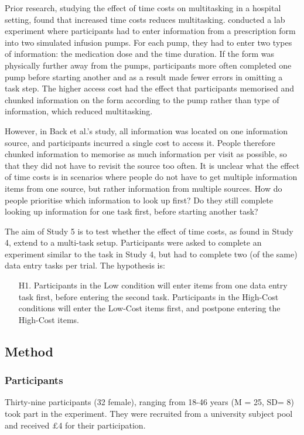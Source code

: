 Prior research, studying the effect of time costs on multitasking in a hospital setting, found that increased time costs reduces multitasking. \citet{Back2012} conducted a lab experiment where participants had to enter information from a prescription form into two simulated infusion pumps. For each pump, they had to enter two types of information: the medication dose and the time duration. If the form was physically further away from the pumps, participants more often completed one pump before starting another and as a result made fewer errors in omitting a task step. The higher access cost had the effect that participants memorised and chunked information on the form according to the pump rather than type of information, which reduced multitasking.

However, in Back et al.'s study, all information was located on one information source, and participants incurred a single cost to access it. People therefore chunked information to memorise as much information per visit as possible, so that they did not have to revisit the source too often. It is unclear what the effect of time costs is in scenarios where people do not have to get multiple information items from one source, but rather information from multiple sources. How do people prioritise which information to look up first? Do they still complete looking up information for one task first, before starting another task?

The aim of Study 5 is to test whether the effect of time costs, as found in Study 4, extend to a multi-task setup. Participants were asked to complete an experiment similar to the task in Study 4, but had to complete two (of the same) data entry tasks per trial. The hypothesis is:

\begin{itemize}
\item [H1.]
Participants in the Low condition will enter items from one data entry task first, before entering the second task. Participants in the High-Cost conditions will enter the Low-Cost items first, and postpone entering the High-Cost items.
\end{itemize}

\subsection{Method}
\subsubsection{Participants}
Thirty-nine participants (32 female), ranging from 18-46 years (M = 25, SD= 8) took part in the experiment. They were recruited from a university subject pool and received $\pounds$4 for their participation.

